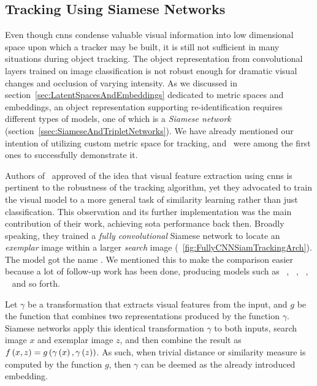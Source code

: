 \subsection{Tracking Using Siamese Networks}
\label{ssec:TrackingUsingSiameseNetworks}

Even though \glspl{cnn} condense valuable visual information into low dimensional space upon which a tracker may be built, it is still not sufficient in many situations during object tracking. The object representation from convolutional layers trained on image classification is not robust enough for dramatic visual changes and occlusion of varying intensity. As we discussed in section~\ref{sec:LatentSpacesAndEmbeddings} dedicated to metric spaces and embeddings, an object representation supporting re-identification requires different types of models, one of which is a \emph{Siamese network} (section~\ref{ssec:SiameseAndTripletNetworks}). We have already mentioned our intention of utilizing custom metric space for tracking, and~\cite{bertinetto2016siamfc} were among the first ones to successfully demonstrate it.

Authors of~\cite{bertinetto2016siamfc} approved of the idea that visual feature extraction using \glspl{cnn} is pertinent to the robustness of the tracking algorithm, yet they advocated to train the visual model to a more general task of similarity learning rather than just classification. This observation and its further implementation was the main contribution of their work, achieving \gls{sota} performance back then. Broadly speaking, they trained a \emph{fully convolutional} Siamese network to locate an \emph{exemplar} image within a larger \emph{search} image (\figstr{}~\ref{fig:FullyCNNSiamTrackingArch}). The model got the name . We mentioned this to make the comparison easier because a lot of follow-up work has been done, producing models such as ~\cite{he2018twofoldsiam}, ~\cite{li2018siamrpn}, ~\cite{wang2019siammask}, ~\cite{chen2019rotbboxes} and so forth.

Let $\gamma$ be a transformation that extracts visual features from the input, and $g$ be the function that combines two representations produced by the function $\gamma$. Siamese networks apply this identical transformation $\gamma$ to both inputs, search image $x$ and exemplar image $z$, and then combine the result as ${f} \left( x, z \right) = {g} \left( {\gamma} \left( x \right), {\gamma} \left( z \right) \right)$. As such, when trivial distance or similarity measure is computed by the function $g$, then $\gamma$ can be deemed as the already introduced embedding.

